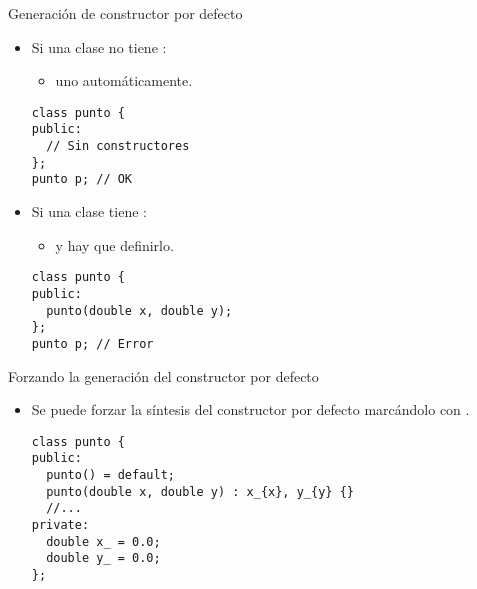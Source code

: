 \begin{frame}[t,fragile]{Generación de constructor por defecto}
\begin{itemize}
  \item Si una clase no tiene :
    \begin{itemize}
      \item {} uno automáticamente.
    \end{itemize}
\begin{lstlisting}
class punto {
public:
  // Sin constructores
};
punto p; // OK
\end{lstlisting}

  \item Si una clase tiene :
    \begin{itemize}
      \item {} y hay que definirlo.
    \end{itemize}
\begin{lstlisting}
class punto {
public:
  punto(double x, double y);
};
punto p; // Error
\end{lstlisting}
\end{itemize}
\end{frame}

\begin{frame}[t,fragile]{Forzando la generación del constructor por defecto}
\begin{itemize}
  \item Se puede forzar la síntesis del constructor por defecto marcándolo
        con .
\begin{lstlisting}
class punto {
public:
  punto() = default;
  punto(double x, double y) : x_{x}, y_{y} {}
  //...
private:
  double x_ = 0.0;
  double y_ = 0.0;
};
\end{lstlisting}
\end{itemize}
\end{frame}
